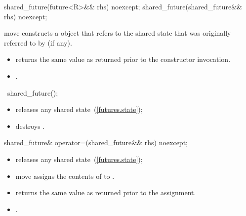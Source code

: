 %
\begin{itemdecl}
shared_future(future<R>&& rhs) noexcept;
shared_future(shared_future&& rhs) noexcept;
\end{itemdecl}

\begin{itemdescr}
\pnum
\effects move constructs a  object that refers to the
shared state that was originally referred to by  (if any).

\pnum
\postconditions
\begin{itemize}
\item {} returns the same value as  returned prior to
the constructor invocation.
\item {}.
\end{itemize}
\end{itemdescr}

%
\begin{itemdecl}
~shared_future();
\end{itemdecl}

\begin{itemdescr}
\pnum
\effects
\begin{itemize}
\item
releases any shared state~(\ref{futures.state});

\item
destroys .
\end{itemize}
\end{itemdescr}

%
%
\begin{itemdecl}
shared_future& operator=(shared_future&& rhs) noexcept;
\end{itemdecl}

\begin{itemdescr}
\pnum
\effects
\begin{itemize}
\item
releases any shared state~(\ref{futures.state});

\item
move assigns the contents of  to .
\end{itemize}

\pnum
\postconditions
\begin{itemize}
\item
{} returns the same value as  returned prior to
the assignment.

\item
{}.
\end{itemize}
\end{itemdescr}

